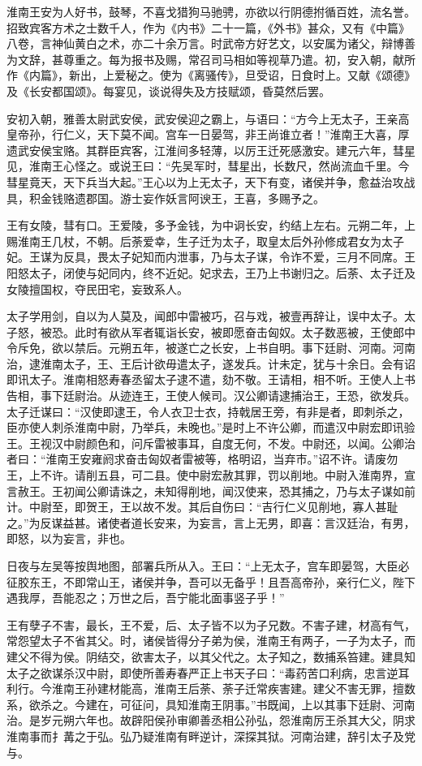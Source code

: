 \documentclass[]{article}
\begin{document}
淮南王安为人好书，鼓琴，不喜戈猎狗马驰骋，亦欲以行阴德拊循百姓，流名誉。招致宾客方术之士数千人，作为《内书》二十一篇，《外书》甚众，又有《中篇》八卷，言神仙黄白之术，亦二十余万言。时武帝方好艺文，以安属为诸父，辩博善为文辞，甚尊重之。每为报书及赐，常召司马相如等视草乃遣。初，安入朝，献所作《内篇》，新出，上爱秘之。使为《离骚传》，旦受诏，日食时上。又献《颂德》及《长安都国颂》。每宴见，谈说得失及方技赋颂，昏莫然后罢。

安初入朝，雅善太尉武安侯，武安侯迎之霸上，与语曰：``方今上无太子，王亲高皇帝孙，行仁义，天下莫不闻。宫车一日晏驾，非王尚谁立者！''淮南王大喜，厚遗武安侯宝赂。其群臣宾客，江淮间多轻薄，以厉王迁死感激安。建元六年，彗星见，淮南王心怪之。或说王曰：``先吴军时，彗星出，长数尺，然尚流血千里。今彗星竟天，天下兵当大起。''王心以为上无太子，天下有变，诸侯并争，愈益治攻战具，积金钱赂遗郡国。游士妄作妖言阿谀王，王喜，多赐予之。

王有女陵，彗有口。王爱陵，多予金钱，为中诇长安，约结上左右。元朔二年，上赐淮南王几杖，不朝。后荼爱幸，生子迁为太子，取皇太后外孙修成君女为太子妃。王谋为反具，畏太子妃知而内泄事，乃与太子谋，令诈不爱，三月不同席。王阳怒太子，闭使与妃同内，终不近妃。妃求去，王乃上书谢归之。后荼、太子迁及女陵擅国权，夺民田宅，妄致系人。

太子学用剑，自以为人莫及，闻郎中雷被巧，召与戏，被壹再辞让，误中太子。太子怒，被恐。此时有欲从军者辄诣长安，被即愿奋击匈奴。太子数恶被，王使郎中令斥免，欲以禁后。元朔五年，被遂亡之长安，上书自明。事下廷尉、河南。河南治，逮淮南太子，王、王后计欲毋遣太子，遂发兵。计未定，犹与十余日。会有诏即讯太子。淮南相怒寿春丞留太子逮不遣，劾不敬。王请相，相不听。王使人上书告相，事下廷尉治。从迹连王，王使人候司。汉公卿请逮捕治王，王恐，欲发兵。太子迁谋曰：``汉使即逮王，令人衣卫士衣，持戟居王旁，有非是者，即刺杀之，臣亦使人刺杀淮南中尉，乃举兵，未晚也。''是时上不许公卿，而遣汉中尉宏即讯验王。王视汉中尉颜色和，问斥雷被事耳，自度无何，不发。中尉还，以闻。公卿治者曰：``淮南王安雍阏求奋击匈奴者雷被等，格明诏，当弃市。''诏不许。请废勿王，上不许。请削五县，可二县。使中尉宏赦其罪，罚以削地。中尉入淮南界，宣言赦王。王初闻公卿请诛之，未知得削地，闻汉使来，恐其捕之，乃与太子谋如前计。中尉至，即贺王，王以故不发。其后自伤曰：``吉行仁义见削地，寡人甚耻之。''为反谋益甚。诸使者道长安来，为妄言，言上无男，即喜：言汉廷治，有男，即怒，以为妄言，非也。

日夜与左吴等按舆地图，部署兵所从入。王曰：``上无太子，宫车即晏驾，大臣必征胶东王，不即常山王，诸侯并争，吾可以无备乎！且吾高帝孙，亲行仁义，陛下遇我厚，吾能忍之；万世之后，吾宁能北面事竖子乎！''

王有孽子不害，最长，王不爱，后、太子皆不以为子兄数。不害子建，材高有气，常怨望太子不省其父。时，诸侯皆得分子弟为侯，淮南王有两子，一子为太子，而建父不得为侯。阴结交，欲害太子，以其父代之。太子知之，数捕系笞建。建具知太子之欲谋杀汉中尉，即使所善寿春严正上书天子曰：``毒药苦口利病，忠言逆耳利行。今淮南王孙建材能高，淮南王后荼、荼子迁常疾害建。建父不害无罪，擅数系，欲杀之。今建在，可征问，具知淮南王阴事。''书既闻，上以其事下廷尉、河南治。是岁元朔六年也。故辟阳侯孙审卿善丞相公孙弘，怨淮南厉王杀其大父，阴求淮南事而扌冓之于弘。弘乃疑淮南有畔逆计，深探其狱。河南治建，辞引太子及党与。
\end{document}
